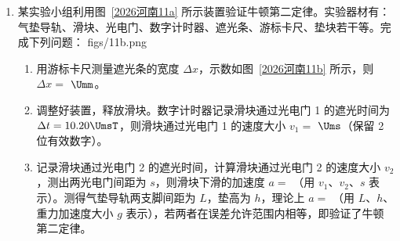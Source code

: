 \documentclass[\gkver]{gaokaozhenti}
\begin{document}
\begin{enumerate}
{则由 $v_{6}+a_{1}t=v_{12}-a_{2}(6\Us-t)$

解得 $t=3\Us$

即第 $9\Us$ 时 N 的速度最大，N 相对于 M 的速度最大值为 $v=v_{6}+a_{1}t=-13.5\Ums$，故 A 错误，CD 正确；

B．$7\Us$ 末时 N 与 M 的间距为

$x=290\Um+v_{6}\times1\Us+\frac{1}{2}a_{1}(1\Us)^{2}=282.75\Um$

故 B 错误。

故选 CD。
}

\item
某实验小组利用图~\ref{2026河南11a} 所示装置验证牛顿第二定律。实验器材有：气垫导轨、滑块、光电门、数字计时器、遮光条、游标卡尺、垫块若干等。完成下列问题：
{figs/11b.png}
\begin{enumerate}
	\item
	用游标卡尺测量遮光条的宽度 $\Delta x$，示数如图~\ref{2026河南11b} 所示，则 $\Delta x=$  $\Umm$。
	\item
	调整好装置，释放滑块。数字计时器记录滑块通过光电门 1 的遮光时间为 $\Delta t=10.20\UmsT$，则滑块通过光电门 1 的速度大小 $v_{1}=$  $\Ums$（保留 2 位有效数字）。
	\item
	记录滑块通过光电门 2 的遮光时间，计算滑块通过光电门 2 的速度大小 $v_{2}$，测出两光电门间距为 $s$，则滑块下滑的加速度 $a=$ （用 $v_{1}$、$v_{2}$、$s$ 表示）。测得气垫导轨两支脚间距为 $L$，垫高为 $h$，理论上 $a=$ （用 $L$、$h$、重力加速度大小 $g$ 表示），若两者在误差允许范围内相等，即验证了牛顿第二定律。
\end{enumerate}

\end{enumerate}
\end{document}
